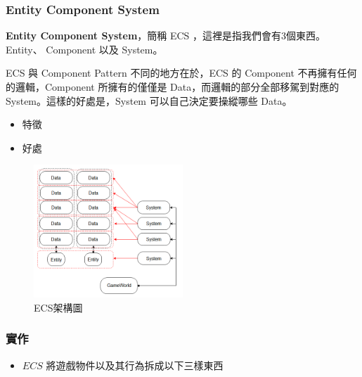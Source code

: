 \subsubsection{Entity Component System}

\textbf{Entity Component System}，簡稱 ECS ，這裡是指我們會有3個東西。Entity、 Component 以及 System。

ECS 與 Component Pattern 不同的地方在於，ECS 的 Component 不再擁有任何的邏輯，Component 所擁有的僅僅是 Data，而邏輯的部分全部移駕到對應的 System。這樣的好處是，System 可以自己決定要操縱哪些 Data。

\begin{itemize}
\item{特徵}
\item{好處} 
\end{itemize}

\begin{figure}[h]
    \begin{center}
        \includegraphics[width=0.5\textwidth]{./resources/ecs/ecs.png}
    \end{center}
\caption{ECS架構圖}
\label{fig:ecs}
\end{figure}

\subsubsection{實作}

\begin{itemize}
    \item{$ECS$ 將遊戲物件以及其行為拆成以下三樣東西}
\end{itemize}

